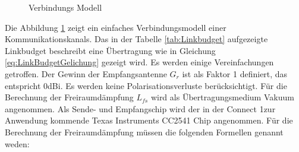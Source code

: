 \begin{figure}[!ht]
\begin{center}
\end{center}
\caption{Verbindungs Modell}
\label{fig:LinkModell}
\end{figure}

Die Abbildung \ref{fig:LinkModell} zeigt ein einfaches Verbindungsmodell einer Kommunikationskanals. Das in der Tabelle \ref{tab:Linkbudget} aufgezeigte Linkbudget beschreibt eine Übertragung wie in Gleichung \ref{eq:LinkBudgetGelichung} gezeigt wird. Es werden einige Vereinfachungen getroffen. Der Gewinn der Empfangsantenne $G_{r}$  ist als Faktor 1 definiert, das entspricht 0dBi. Es werden keine Polarisationsverluste berücksichtigt. Für die Berechnung der Freiraumdämpfung $L_{fs}$ wird als Übertragungsmedium Vakuum angenommen. Als Sende- und Empfangschip wird der in der \glqq Connect 1\grqq zur Anwendung kommende Texas Instruments CC2541 Chip angenommen. Für die Berechnung der Freiraumdämpfung müssen die folgenden Formellen genannt weden\cite{Tekom}:
 
